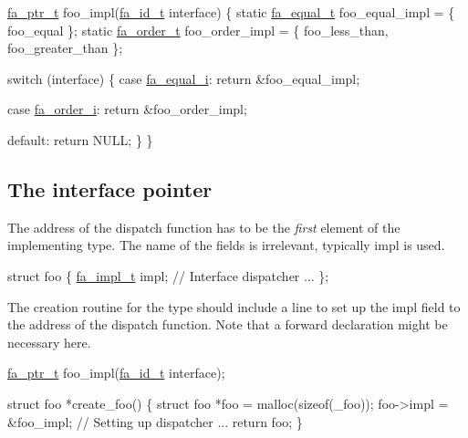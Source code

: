 \begin{DoxyCode}
\hyperlink{group___fa_ga915ddeae99ad7568b273d2b876425197}{fa\_ptr\_t} foo\_impl(\hyperlink{group___fa_gaeb5011c69dfea4d2c41c05a2c95899d0}{fa\_id\_t} interface)
\{
    \textcolor{keyword}{static} \hyperlink{structfa__equal__t}{fa\_equal\_t} foo\_equal\_impl = \{ foo\_equal \};
    \textcolor{keyword}{static} \hyperlink{structfa__order__t}{fa\_order\_t} foo\_order\_impl = \{ foo\_less\_than, foo\_greater\_than \};

    \textcolor{keywordflow}{switch} (interface)
    \{
    \textcolor{keywordflow}{case} \hyperlink{interfaces_8h_a7c337b4de759549a84c656770ce01cd2a9b8bb278c9a713e6ec54d275002e0a01}{fa\_equal\_i}:
        \textcolor{keywordflow}{return} &foo\_equal\_impl;

    \textcolor{keywordflow}{case} \hyperlink{interfaces_8h_a7c337b4de759549a84c656770ce01cd2ae08a92558a44d2796dc2a5df8ff1b3c3}{fa\_order\_i}:
        \textcolor{keywordflow}{return} &foo\_order\_impl;

    \textcolor{keywordflow}{default}:
        \textcolor{keywordflow}{return} NULL;
    \}
\}
\end{DoxyCode}
\hypertarget{md__interfaces_Pointer}{}\subsection{The interface pointer}\label{md__interfaces_Pointer}
The address of the dispatch function has to be the {\itshape first} element of the implementing type. The name of the fields is irrelevant, typically {\ttfamily impl} is used.


\begin{DoxyCode}
\textcolor{keyword}{struct }foo
\{
    \hyperlink{group___fa_gac13cc6d4ef02b8763045164333cfd763}{fa\_impl\_t} impl;     \textcolor{comment}{//  Interface dispatcher}
    ...
\};
\end{DoxyCode}


The creation routine for the type should include a line to set up the {\ttfamily impl} field to the address of the dispatch function. Note that a forward declaration might be necessary here.


\begin{DoxyCode}
\hyperlink{group___fa_ga915ddeae99ad7568b273d2b876425197}{fa\_ptr\_t} foo\_impl(\hyperlink{group___fa_gaeb5011c69dfea4d2c41c05a2c95899d0}{fa\_id\_t} interface);

\textcolor{keyword}{struct }foo *create\_foo()
\{
    \textcolor{keyword}{struct }foo *foo = malloc(\textcolor{keyword}{sizeof}(\_foo));
    foo->impl = &foo\_impl;                      \textcolor{comment}{//  Setting up dispatcher}
    ...
    \textcolor{keywordflow}{return} foo;
\}
\end{DoxyCode}
 